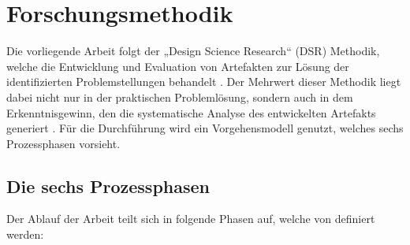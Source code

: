 \section{Forschungsmethodik}

Die vorliegende Arbeit folgt der „Design Science Research“ (DSR) Methodik, 
welche die Entwicklung und Evaluation von Artefakten zur Lösung der 
identifizierten Problemstellungen behandelt \cite{peffers2007design}. 
Der Mehrwert dieser Methodik liegt dabei nicht nur in der praktischen 
Problemlösung, sondern auch in dem Erkenntnisgewinn, den die systematische 
Analyse des entwickelten Artefakts generiert \cite{peffers2007design, hevner2004design}.
Für die Durchführung wird ein Vorgehensmodell genutzt, welches sechs Prozessphasen 
vorsieht.

\subsection{Die sechs Prozessphasen}
Der Ablauf der Arbeit teilt sich in folgende Phasen auf, welche von \cite{peffers2007design} 
definiert werden:

